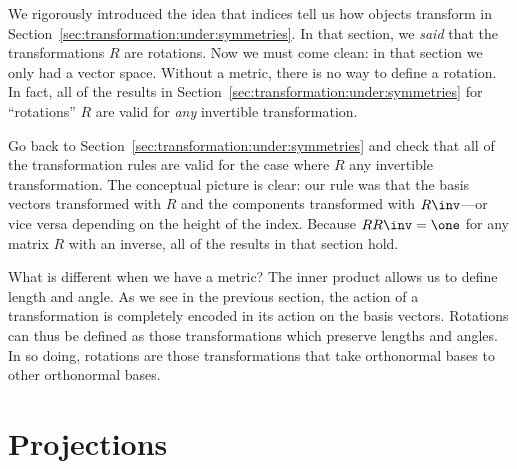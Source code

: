 We rigorously introduced the idea that indices tell us how objects transform in Section~\ref{sec:transformation:under:symmetries}. In that section, we \emph{said} that the transformations $R$ are rotations. Now we must come clean: in that section we only had a vector space. Without a metric, there is no way to define a rotation. In fact, all of the results in Section~\ref{sec:transformation:under:symmetries} for ``rotations'' $R$ are valid for \emph{any} invertible transformation.
\begin{exercise}
Go back to Section~\ref{sec:transformation:under:symmetries} and check that all of the transformation rules are valid for the case where $R$ any invertible transformation. The conceptual picture is clear: our rule was that the basis vectors transformed with $R$ and the components transformed with $R\inv$---or vice versa depending on the height of the index. Because $RR\inv = \one$ for any matrix $R$ with an inverse, all of the results in that section hold.
\end{exercise}

What is different when we have a metric? The inner product allows us to define length and angle. As we see in the previous section, the action of a transformation is completely encoded in its action on the basis vectors. Rotations can thus be defined as those transformations which preserve lengths and angles. In so doing, rotations are those transformations that take orthonormal bases to other orthonormal bases. 




\section{Projections}
\label{sec:projections}



